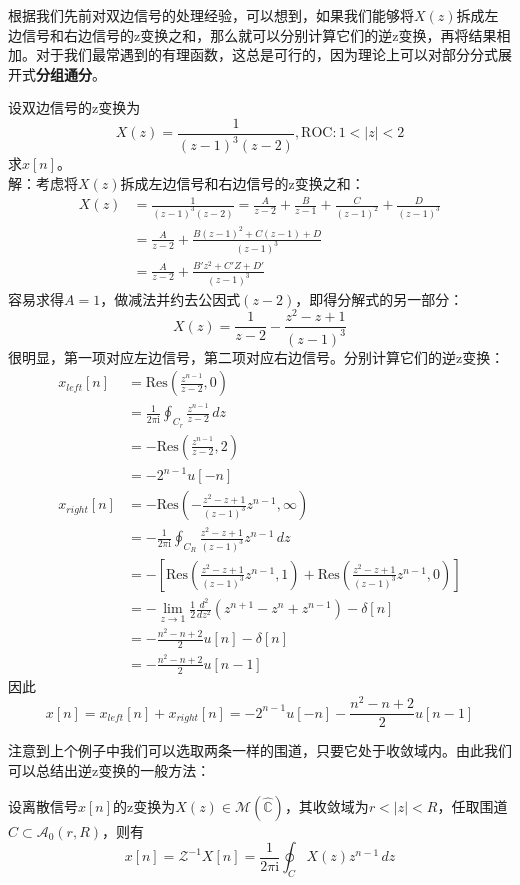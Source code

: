 \documentclass{ctexbook}
\begin{document}
根据我们先前对双边信号的处理经验，可以想到，如果我们能够将$X(z)$拆成左边信号和右边信号的z变换之和，那么就可以分别计算它们的逆z变换，再将结果相加。对于我们最常遇到的有理函数，这总是可行的，因为理论上可以对部分分式展开式\textbf{分组通分}。
\begin{example}
    设双边信号的z变换为
    \[X(z)=\frac{1}{(z-1)^3(z-2)},\text{ROC}:1<|z|<2\]
    求$x[n]$。\\
    解：考虑将$X(z)$拆成左边信号和右边信号的z变换之和：
    \begin{align*}
        X(z)&=\frac{1}{(z-1)^3(z-2)}=\frac{A}{z-2}+\frac{B}{z-1}+\frac{C}{(z-1)^2}+\frac{D}{(z-1)^3}\\
        &=\frac{A}{z-2}+\frac{B(z-1)^2+C(z-1)+D}{(z-1)^3}\\
        &=\frac{A}{z-2}+\frac{B'z^2+C'Z+D'}{(z-1)^3}
    \end{align*}
    容易求得$A=1$，做减法并约去公因式$(z-2)$，即得分解式的另一部分：
    \[X(z)=\frac{1}{z-2}-\frac{z^2-z+1}{(z-1)^3}\]
    很明显，第一项对应左边信号，第二项对应右边信号。分别计算它们的逆z变换：
    \begin{align*}
        x_{left}[n]&=\text{Res}\left(\frac{z^{n-1}}{z-2},0\right)\\
        &=\frac{1}{2\pi \mathrm{i}}\oint_{C_r}\frac{z^{n-1}}{z-2}\,dz\\
        &=-\text{Res}\left(\frac{z^{n-1}}{z-2},2\right)\\
        &=-2^{n-1}u[-n]\\
        x_{right}[n]&=-\text{Res}\left(-\frac{z^2-z+1}{(z-1)^3}z^{n-1},\infty\right)\\
        &=-\frac{1}{2\pi \mathrm{i}}\oint_{C_R}\frac{z^2-z+1}{(z-1)^3}z^{n-1}\,dz\\
        &=-\left[\text{Res}\left(\frac{z^2-z+1}{(z-1)^3}z^{n-1},1\right)+\text{Res}\left(\frac{z^2-z+1}{(z-1)^3}z^{n-1},0\right)\right]\\
        &=-\lim_{z\to 1}\frac{1}{2}\frac{d^2}{dz^2}\left(z^{n+1}-z^{n}+z^{n-1}\right)-\delta[n]\\
        &=-\frac{n^2-n+2}{2}u[n]-\delta[n]\\
        &=-\frac{n^2-n+2}{2}u[n-1]
    \end{align*}
    因此
    \[x[n]=x_{left}[n]+x_{right}[n]=-2^{n-1}u[-n]-\frac{n^2-n+2}{2}u[n-1]\]
\end{example}

注意到上个例子中我们可以选取两条一样的围道，只要它处于收敛域内。由此我们可以总结出逆z变换的一般方法：
\begin{theorem}
    设离散信号$x[n]$的z变换为$X(z)\in\mathcal{M} \left(\hat{\mathbb{C}}\right)$，其收敛域为$r<|z|<R$，任取围道$C\subset\mathcal{A} _0(r,R)$，则有
    \[x[n]=\mathcal{Z} ^{-1}X[n]=\frac{1}{2\pi \mathrm{i}}\oint_{C}X(z)z^{n-1}\,dz\]
\end{theorem}
\end{document}
